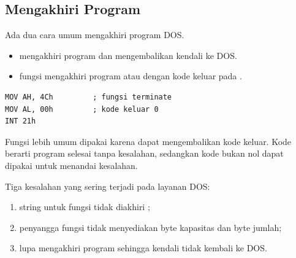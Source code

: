 \subsection{Mengakhiri Program}

Ada dua cara umum mengakhiri program DOS.

\begin{itemize}
    \item {} mengakhiri program  dan
          mengembalikan kendali ke DOS.
    \item {} fungsi  mengakhiri program
           atau  dengan kode keluar pada
          .
\end{itemize}

\begin{lstlisting}[language=MASM, numbers=none]
MOV AH, 4Ch         ; fungsi terminate
MOV AL, 00h         ; kode keluar 0
INT 21h
\end{lstlisting}

\begin{infobox}
\vspace{1.1em}
Fungsi  lebih umum dipakai karena dapat mengembalikan kode
keluar. Kode  berarti program selesai tanpa kesalahan,
sedangkan kode bukan nol dapat dipakai untuk menandai kesalahan.
\end{infobox}

\begin{peringatanbox}
\vspace{1.1em}
Tiga kesalahan yang sering terjadi pada layanan DOS:
\begin{enumerate}
    \item string untuk fungsi  tidak diakhiri ;
    \item penyangga fungsi  tidak menyediakan byte kapasitas
          dan byte jumlah;
    \item lupa mengakhiri program sehingga kendali tidak kembali ke
          DOS.
\end{enumerate}
\end{peringatanbox}
